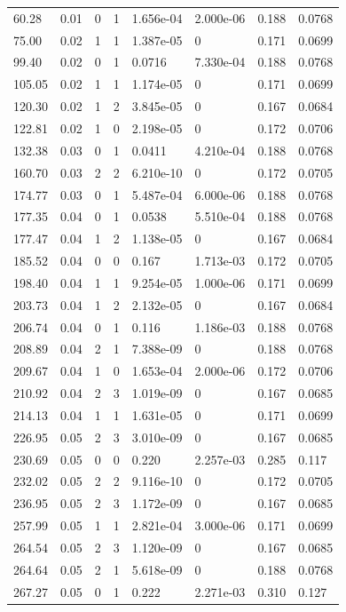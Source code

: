 \documentclass[preview]{standalone}
\begin{document}
{{\begin{tabular}{L{1.2cm}C{1.2cm} C{0.3cm}C{0.5cm} C{1.4cm}C{1.4cm} C{1.4cm}C{1.4cm}}
  60.28  &  0.01  & 0     &  1 &  1.656e-04  & 2.000e-06  & 0.188 &  0.0768   \\ 
  75.00  &  0.02  & 1     &  1 &  1.387e-05  & 0  & 0.171 &  0.0699   \\ 
  99.40  &  0.02  & 0     &  1 &  0.0716  & 7.330e-04  & 0.188 &  0.0768   \\ 
  105.05  &  0.02  & 1     &  1 &  1.174e-05  & 0  & 0.171 &  0.0699   \\ 
  120.30  &  0.02  & 1     &  2 &  3.845e-05  & 0  & 0.167 &  0.0684   \\ 
  122.81  &  0.02  & 1     &  0 &  2.198e-05  & 0  & 0.172 &  0.0706   \\ 
  132.38  &  0.03  & 0     &  1 &  0.0411  & 4.210e-04  & 0.188 &  0.0768   \\ 
  160.70  &  0.03  & 2     &  2 &  6.210e-10  & 0  & 0.172 &  0.0705   \\ 
  174.77  &  0.03  & 0     &  1 &  5.487e-04  & 6.000e-06  & 0.188 &  0.0768   \\ 
  177.35  &  0.04  & 0     &  1 &  0.0538  & 5.510e-04  & 0.188 &  0.0768   \\ 
  177.47  &  0.04  & 1     &  2 &  1.138e-05  & 0  & 0.167 &  0.0684   \\ 
  185.52  &  0.04  & 0     &  0 &  0.167  & 1.713e-03  & 0.172 &  0.0705   \\ 
  198.40  &  0.04  & 1     &  1 &  9.254e-05  & 1.000e-06  & 0.171 &  0.0699   \\ 
  203.73  &  0.04  & 1     &  2 &  2.132e-05  & 0  & 0.167 &  0.0684   \\ 
  206.74  &  0.04  & 0     &  1 &  0.116  & 1.186e-03  & 0.188 &  0.0768   \\ 
  208.89  &  0.04  & 2     &  1 &  7.388e-09  & 0  & 0.188 &  0.0768   \\ 
  209.67  &  0.04  & 1     &  0 &  1.653e-04  & 2.000e-06  & 0.172 &  0.0706   \\ 
  210.92  &  0.04  & 2     &  3 &  1.019e-09  & 0  & 0.167 &  0.0685   \\ 
  214.13  &  0.04  & 1     &  1 &  1.631e-05  & 0  & 0.171 &  0.0699   \\ 
  226.95  &  0.05  & 2     &  3 &  3.010e-09  & 0  & 0.167 &  0.0685   \\ 
  230.69  &  0.05  & 0     &  0 &  0.220  & 2.257e-03  & 0.285 &  0.117   \\ 
  232.02  &  0.05  & 2     &  2 &  9.116e-10  & 0  & 0.172 &  0.0705   \\ 
  236.95  &  0.05  & 2     &  3 &  1.172e-09  & 0  & 0.167 &  0.0685   \\ 
  257.99  &  0.05  & 1     &  1 &  2.821e-04  & 3.000e-06  & 0.171 &  0.0699   \\ 
  264.54  &  0.05  & 2     &  3 &  1.120e-09  & 0  & 0.167 &  0.0685   \\ 
  264.64  &  0.05  & 2     &  1 &  5.618e-09  & 0  & 0.188 &  0.0768   \\ 
  267.27  &  0.05  & 0     &  1 &  0.222  & 2.271e-03  & 0.310 &  0.127   \\ 
\hline 
\end{tabular} 

}}
\end{document}
